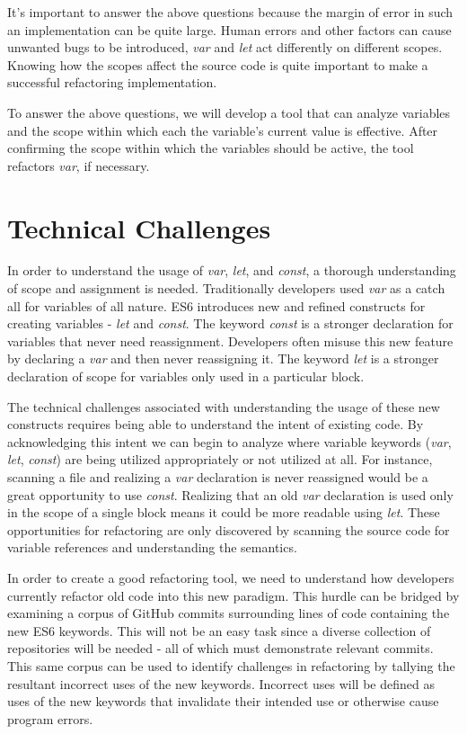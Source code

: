 \documentclass{sig-alternate}
\begin{document}
It's important to answer the above questions because the margin of error in such an implementation can be quite large. Human errors and other factors can cause unwanted bugs to be introduced, \textit{var} and \textit{let} act differently on different scopes. 
Knowing how the scopes affect the source code is quite important to make a successful refactoring implementation.

To answer the above questions, we will develop a tool that can analyze variables and the scope within which each the variable's current value is effective.
After confirming the scope within which the variables should be active, the tool refactors \textit{var}, if necessary.

\section{Technical Challenges}
In order to understand the usage of \textit{var}, \textit{let}, and \textit{const}, a thorough understanding of scope and assignment is needed. 
Traditionally developers used \textit{var} as a catch all for variables of all nature.
ES6 introduces new and refined constructs for creating variables - \textit{let} and \textit{const}. 
The keyword \textit{const} is a stronger declaration for variables that never need reassignment. 
Developers often misuse this new feature by declaring a \textit{var} and then never reassigning it. 
The keyword \textit{let} is a stronger declaration of scope for variables only used in a particular block. 

The technical challenges associated with understanding the usage of these new constructs requires being able to understand the intent of existing code. 
By acknowledging this intent we can begin to analyze where variable keywords (\textit{var}, \textit{let}, \textit{const}) are being utilized appropriately or not utilized at all. 
For instance, scanning a file and realizing a \textit{var} declaration is never reassigned would be a great opportunity to use \textit{const}. 
Realizing that an old \textit{var} declaration is used only in the scope of a single block means it could be more readable using \textit{let}. 
These opportunities for refactoring are only discovered by scanning the source code for variable references and understanding the semantics.

In order to create a good refactoring tool, we need to understand how developers currently refactor old code into this new paradigm. 
This hurdle can be bridged by examining a corpus of GitHub commits surrounding lines of code containing the new ES6 keywords. 
This will not be an easy task since a diverse collection of repositories will be needed - all of which must demonstrate relevant commits. 
This same corpus can be used to identify challenges in refactoring by tallying the resultant incorrect uses of the new keywords. 
Incorrect uses will be defined as uses of the new keywords that invalidate their intended use or otherwise cause program errors. 
\end{document}
